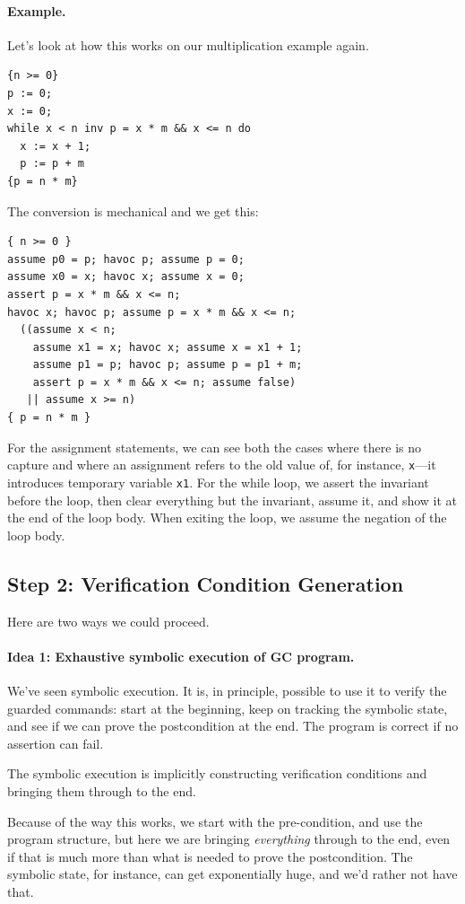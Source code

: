 \documentclass[11pt]{article}
\begin{document}
\newpage
\paragraph{Example.} Let's look at how this works on our multiplication example again.
\begin{lstlisting}
{n >= 0} 
p := 0; 
x := 0; 
while x < n inv p = x * m && x <= n do 
  x := x + 1; 
  p := p + m
{p = n * m}
\end{lstlisting}
The conversion is mechanical and we get this:
\begin{lstlisting}
{ n >= 0 }
assume p0 = p; havoc p; assume p = 0; 
assume x0 = x; havoc x; assume x = 0; 
assert p = x * m && x <= n;
havoc x; havoc p; assume p = x * m && x <= n;
  ((assume x < n; 
    assume x1 = x; havoc x; assume x = x1 + 1; 
    assume p1 = p; havoc p; assume p = p1 + m; 
    assert p = x * m && x <= n; assume false) 
   || assume x >= n)
{ p = n * m }
\end{lstlisting}
For the assignment statements, we can see both the cases where there is no capture and where an assignment
refers to the old value of, for instance, \texttt{x}---it introduces temporary variable \texttt{x1}.
For the while loop, we assert the invariant before the loop, then clear everything but the invariant, assume it,
and show it at the end of the loop body. When exiting the loop, we assume the negation of the loop body.

\subsection*{Step 2: Verification Condition Generation}
Here are two ways we could proceed.

\paragraph{Idea 1: Exhaustive symbolic execution of GC program.}
We've seen symbolic execution. It is, in principle, possible to use it to verify the guarded commands:
start at the beginning, keep on tracking the symbolic state, and see if we can prove the postcondition at the end.
The program is correct if no assertion can fail.

The symbolic execution is implicitly constructing verification conditions and bringing them through to the end.

Because of the way this works, we start with the pre-condition, and use the program structure, but here we are
bringing \emph{everything} through to the end, even if that is much more than what is needed to prove the postcondition.
The symbolic state, for instance, can get exponentially huge, and we'd rather not have that.
\end{document}
